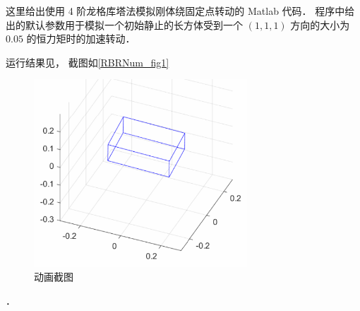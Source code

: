 

这里给出使用 4 阶龙格库塔法模拟刚体绕固定点转动的 Matlab 代码． 程序中给出的默认参数用于模拟一个初始静止的长方体受到一个 $(1,1,1)$ 方向的大小为 $0.05$ 的恒力矩时的加速转动．

运行结果见， 截图如\autoref{RBRNum_fig1}

\begin{figure}[ht]
\centering
\includegraphics[width=8cm]{./figures/RBRNum1.png}
\caption{动画截图} \label{RBRNum_fig1}
\end{figure}．
